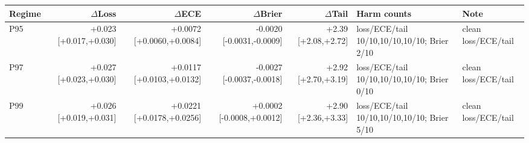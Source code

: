 \begin{tabular}{@{}lrrrrll@{}}
  \toprule
  Regime & $\Delta$Loss & $\Delta$ECE & $\Delta$Brier & $\Delta$Tail & Harm counts & Note \\
  \midrule
  P95 & +0.023 [+0.017,+0.030] & +0.0072 [+0.0060,+0.0084] & -0.0020 [-0.0031,-0.0009] & +2.39 [+2.08,+2.72] & loss/ECE/tail 10/10,10/10,10/10; Brier 2/10 & clean loss/ECE/tail \\
  P97 & +0.027 [+0.023,+0.030] & +0.0117 [+0.0103,+0.0132] & -0.0027 [-0.0037,-0.0018] & +2.92 [+2.70,+3.19] & loss/ECE/tail 10/10,10/10,10/10; Brier 0/10 & clean loss/ECE/tail \\
  P99 & +0.026 [+0.019,+0.031] & +0.0221 [+0.0178,+0.0256] & +0.0002 [-0.0008,+0.0012] & +2.90 [+2.36,+3.33] & loss/ECE/tail 10/10,10/10,10/10; Brier 5/10 & clean loss/ECE/tail \\
  \bottomrule
\end{tabular}
